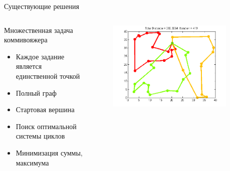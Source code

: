 \documentclass{beamer}
\begin{document}
\begin{frame}{Существующие решения}
\begin{columns}[onlytextwidth, t]
    \begin{column}{0.6\textwidth}
        Множественная задача коммивояжера
        \begin{itemize}
        \item Каждое задание является единственной точкой
        \item Полный граф
        \item Стартовая вершина
        \item Поиск оптимальной системы циклов
        \item Минимизация суммы, максимума
        \end{itemize}

    \end{column}
    \begin{column}{0.4\textwidth}

        \begin{figure}[here]
            \includegraphics[scale=0.4]{images/mtsp.png}
        \end{figure}
    \end{column}

​\end{columns}

\end{frame}
\end{document}
